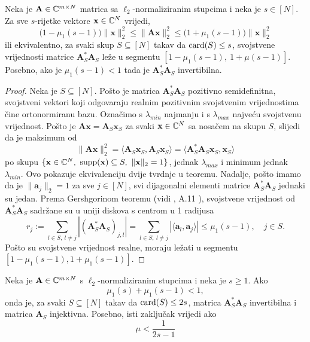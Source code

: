 \documentclass[a4paper,twoside,12pt]{memoir} %
\newcommand{\vect}[1]{\mathbf{#1}}
\renewcommand{\vec}{\vect}
\newcommand{\card}{\text{\normalfont{card}}}
\newcommand{\supp}{\text{\normalfont{supp}}}
\newcommand{\norm}[1]{\|{#1}\|}
\begin{document}
\begin{thm}\label{tm:5:3}
    Neka je $\vec A \in \C^{m \times N}$ matrica sa $\ell_2$-normaliziranim stupcima i neka je $s \in [N]$. Za sve $s$-rijetke vektore $\vec x \in \C^N$ vrijedi,
    \begin{equation*}
        \big(1-\mu_1(s-1)\big) \norm{\vec x}_2^2 \leq \norm{\vec{Ax}}_2^2 \leq \big(1+\mu_1(s-1)\big) \norm{\vec x}_2^2
    \end{equation*}
    ili ekvivalentno, za svaki skup $S \subseteq [N]$ takav da $\card(S) \leq s$, svojstvene vrijednosti matrice $\vec A^*_S \vec A_S$ le\v{z}e u segmentu $[1-\mu_1(s-1),\ 1+\mu(s-1)]$. Posebno, ako je $\mu_1(s-1) < 1$ tada je $\vec A^*_S \vec A_S$ invertibilna.
\end{thm}
\begin{proof}
    Neka je $S \subseteq [N]$. Po\v{s}to je matrica $\vec A^*_S \vec A_S$ pozitivno semidefinitna, svojstveni vektori koji odgovaraju realnim pozitivnim svojstvenim vrijednostima \v{c}ine ortonormiranu bazu. Ozna\v{c}imo s $\lambda_{min}$ najmanju i s $\lambda_{max}$ najve\'cu svojstvenu vrijednost. Po\v{s}to je $\vec{Ax} = \vec A_S \vec x_S$ za svaki $\vec x \in \C^N$ sa nosa\v{c}em na skupu $S$, slijedi da je maksimum od
    \begin{equation*}
        \norm{\vec{Ax}}_2^2 = \langle \vec A_S \vec x_S, \vec A_S \vec x_S  \rangle = \langle \vec A^*_S \vec A_S \vec x_S, \vec x_S \rangle
    \end{equation*}
    po skupu $\{\vec x \in \C^N,\ \supp (\vec x) \subseteq S,\ \norm{\vec x}_2 = 1\}$, jednak $\lambda_{max}$ i minimum jednak $\lambda_{min}$. Ovo pokazuje ekvivalenciju dvije tvrdnje u teoremu. Nadalje, po\v{s}to imamo da je $\norm{\vec a_j}_2 = 1$ za sve $j \in [N]$, svi dijagonalni elementi matrice $\vec A^*_S \vec A_S$ jednaki su jedan. Prema Gershgorinom teoremu (vidi \cite{gerschgorin31}, A.11 \cite{foucart13}), svojstvene vrijednost od $\vec A^*_S \vec A_S$ sadr\v{z}ane su u uniji diskova s centrom u 1 radijusa
    \begin{equation*}
        r_j := \sum_{l \in S,\ l \neq j} |(\vec A^*_S \vec A_S)_{j,l}| = \sum_{l \in S,\ l \neq j} |\langle \vec a_l, \vec a_j \rangle| \leq \mu_1 (s-1),\quad j \in S.
    \end{equation*}
    \newpage
    Po\v{s}to su svojstvene vrijednost realne, moraju le\v{z}ati u segmentu $[1-\mu_1(s-1), 1+ \mu_1(s-1)]$.
\end{proof}
\begin{cor}\label{kor:5:4}
    Neka je $\vec A \in \C^{m \times N}$ s $\ell_2$-normaliziranim stupcima i neka je $s \geq 1$. Ako  
    \begin{equation*}
        \mu_1(s) + \mu_1(s-1) < 1, 
    \end{equation*}
    onda je, za svaki $S \subseteq [N]$ takav da $\card(S) \leq 2s$, matrica $\vec A^*_S \vec A_S$ invertibilna i matrica $\vec A_S$ injektivna. Posebno, isti zaklju\v{c}ak vrijedi ako
    \begin{equation*}
        \mu < \frac{1}{2s - 1}  
    \end{equation*}
\end{cor}
\end{document}
